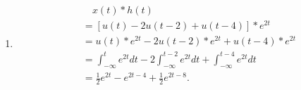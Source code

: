 \documentclass[a4paper,UTF8]{article}
\numberwithin{equation}{section}
\begin{document}
\begin{framed}
\begin{enumerate}[(1)]
    \item  
    \begin{align*}
    	&\quad x(t)*h(t)\\
    	&= [u(t) -2u(t-2) + u(t-4)] * e^{2t}\\
    	&= u(t) * e^{2t} - 2u(t-2)* e^{2t}+ u(t-4) * e^{2t}\\
    	&= \int_{-\infty}^{t}e^{2t}dt -2\int_{-\infty}^{t-2}e^{2t}dt + \int_{-\infty}^{t-4}e^{2t}dt\\
    	&= \frac{1}{2}e^{2t} - e^{2t-4} + \frac{1}{2}e^{2t-8}.
    \end{align*}
\end{enumerate}
\end{framed}
\newpage
\end{document}
